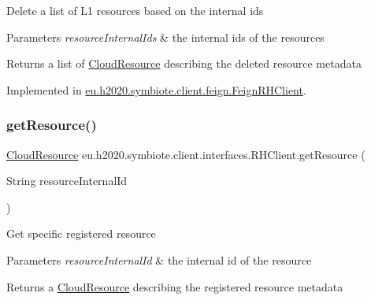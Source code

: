 Delete a list of L1 resources based on the internal ids


\begin{DoxyParams}{Parameters}
{\em resource\+Internal\+Ids} & the internal ids of the resources \\
\hline
\end{DoxyParams}
\begin{DoxyReturn}{Returns}
a list of \hyperlink{}{Cloud\+Resource} describing the deleted resource metadata 
\end{DoxyReturn}


Implemented in \hyperlink{classeu_1_1h2020_1_1symbiote_1_1client_1_1feign_1_1FeignRHClient_ae56343520532a4d10423bfa99d49787f}{eu.\+h2020.\+symbiote.\+client.\+feign.\+Feign\+R\+H\+Client}.

\mbox{\label{interfaceeu_1_1h2020_1_1symbiote_1_1client_1_1interfaces_1_1RHClient_a13899a508ce181ceafd5e04fe5147a4a}} 
\subsubsection{\texorpdfstring{get\+Resource()}{getResource()}}
{\footnotesize\ttfamily \hyperlink{classeu_1_1h2020_1_1symbiote_1_1cloud_1_1model_1_1internal_1_1CloudResource}{Cloud\+Resource} eu.\+h2020.\+symbiote.\+client.\+interfaces.\+R\+H\+Client.\+get\+Resource (\begin{DoxyParamCaption}\item[{String}]{resource\+Internal\+Id }\end{DoxyParamCaption})}

Get specific registered resource


\begin{DoxyParams}{Parameters}
{\em resource\+Internal\+Id} & the internal id of the resource \\
\hline
\end{DoxyParams}
\begin{DoxyReturn}{Returns}
a \hyperlink{}{Cloud\+Resource} describing the registered resource metadata 
\end{DoxyReturn}


